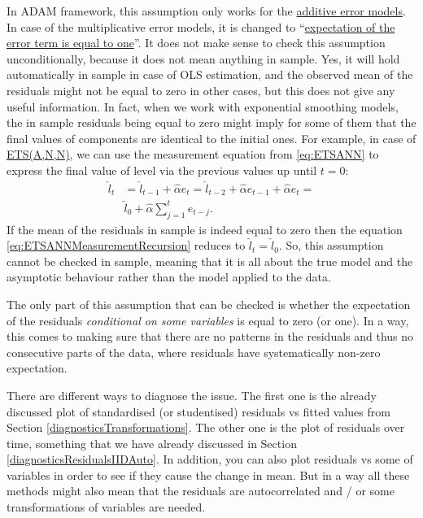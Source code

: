 \documentclass[
]{book}
\theoremstyle{definition}
\theoremstyle{definition}
\theoremstyle{definition}
\theoremstyle{definition}
\theoremstyle{remark}
\begin{document}
In ADAM framework, this assumption only works for the \protect\hyperlink{ADAMETSPureAdditive}{additive error models}. In case of the multiplicative error models, it is changed to ``\protect\hyperlink{ADAMETSMultiplicativeDistributions}{expectation of the error term is equal to one}''. It does not make sense to check this assumption unconditionally, because it does not mean anything in sample. Yes, it will hold automatically in sample in case of OLS estimation, and the observed mean of the residuals might not be equal to zero in other cases, but this does not give any useful information. In fact, when we work with exponential smoothing models, the in sample residuals being equal to zero might imply for some of them that the final values of components are identical to the initial ones. For example, in case of \protect\hyperlink{SESandETS}{ETS(A,N,N)}, we can use the measurement equation from \eqref{eq:ETSANN} to express the final value of level via the previous values up until \(t=0\):
\begin{equation}
  \begin{aligned}
    \hat{l}_t &= \hat{l}_{t-1} + \hat{\alpha} e_t = \hat{l}_{t-2} + \hat{\alpha} e_{t-1} + \hat{\alpha} e_t = \\
              & \hat{l}_0 + \hat{\alpha} \sum_{j=1}^t e_{t-j} .
  \end{aligned}
\label{eq:ETSANNMeasurementRecursion}
\end{equation}
If the mean of the residuals in sample is indeed equal to zero then the equation \eqref{eq:ETSANNMeasurementRecursion} reduces to \(\hat{l}_t=\hat{l}_0\). So, this assumption cannot be checked in sample, meaning that it is all about the true model and the asymptotic behaviour rather than the model applied to the data.

The only part of this assumption that can be checked is whether the expectation of the residuals \emph{conditional on some variables} is equal to zero (or one). In a way, this comes to making sure that there are no patterns in the residuals and thus no consecutive parts of the data, where residuals have systematically non-zero expectation.

There are different ways to diagnose the issue. The first one is the already discussed plot of standardised (or studentised) residuals vs fitted values from Section \ref{diagnosticsTransformations}. The other one is the plot of residuals over time, something that we have already discussed in Section \ref{diagnosticsResidualsIIDAuto}. In addition, you can also plot residuals vs some of variables in order to see if they cause the change in mean. But in a way all these methods might also mean that the residuals are autocorrelated and / or some transformations of variables are needed.
\end{document}
